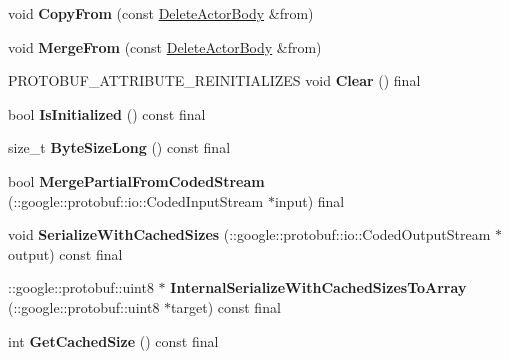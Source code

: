\begin{DoxyCompactItemize}
void {\bfseries Copy\+From} (const \hyperlink{classtbBasics_1_1DeleteActorBody}{Delete\+Actor\+Body} \&from)
\item 
\mbox{\label{classtbBasics_1_1DeleteActorBody_ae70bcc0fa8da86834c2bdd4797dc4587}} 
void {\bfseries Merge\+From} (const \hyperlink{classtbBasics_1_1DeleteActorBody}{Delete\+Actor\+Body} \&from)
\item 
\mbox{\label{classtbBasics_1_1DeleteActorBody_a34e8d6c8094704f073a0480472e6184a}} 
P\+R\+O\+T\+O\+B\+U\+F\+\_\+\+A\+T\+T\+R\+I\+B\+U\+T\+E\+\_\+\+R\+E\+I\+N\+I\+T\+I\+A\+L\+I\+Z\+ES void {\bfseries Clear} () final
\item 
\mbox{\label{classtbBasics_1_1DeleteActorBody_a37d0ed7bbc6044bb41f26c235f021acb}} 
bool {\bfseries Is\+Initialized} () const final
\item 
\mbox{\label{classtbBasics_1_1DeleteActorBody_a44a787853a48cac514a6917b37094ddd}} 
size\+\_\+t {\bfseries Byte\+Size\+Long} () const final
\item 
\mbox{\label{classtbBasics_1_1DeleteActorBody_a4f79c0df81861278c403e52a3f949d9b}} 
bool {\bfseries Merge\+Partial\+From\+Coded\+Stream} (\+::google\+::protobuf\+::io\+::\+Coded\+Input\+Stream $\ast$input) final
\item 
\mbox{\label{classtbBasics_1_1DeleteActorBody_aee7f4ce560277c9466d3fb97d38af628}} 
void {\bfseries Serialize\+With\+Cached\+Sizes} (\+::google\+::protobuf\+::io\+::\+Coded\+Output\+Stream $\ast$output) const final
\item 
\mbox{\label{classtbBasics_1_1DeleteActorBody_aa2f249fa48fa177247853a7da9c3045a}} 
\+::google\+::protobuf\+::uint8 $\ast$ {\bfseries Internal\+Serialize\+With\+Cached\+Sizes\+To\+Array} (\+::google\+::protobuf\+::uint8 $\ast$target) const final
\item 
\mbox{\label{classtbBasics_1_1DeleteActorBody_a38e25d46b81eeca00895e42b6d95cb0f}} 
int {\bfseries Get\+Cached\+Size} () const final

\end{DoxyCompactItemize}
